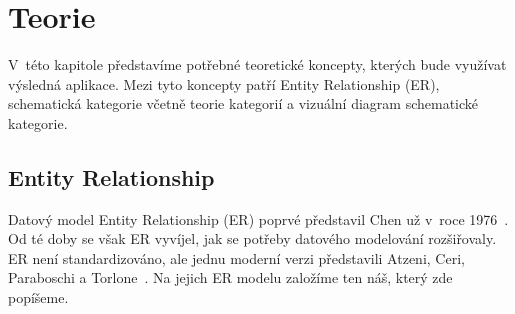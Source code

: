 \chapter{Teorie}

V~této kapitole představíme potřebné teoretické koncepty, kterých bude využívat výsledná aplikace.
Mezi tyto koncepty patří Entity Relationship (ER), schematická kategorie včetně teorie kategorií a vizuální diagram schematické kategorie.

\section{Entity Relationship}

Datový model Entity Relationship (ER) poprvé představil Chen už v~roce 1976~\cite{chen_entity-relationship_1976}.
Od té doby se však ER vyvíjel, jak se potřeby datového modelování rozšiřovaly.
ER není standardizováno, ale jednu moderní verzi představili Atzeni, Ceri, Paraboschi a Torlone~\cite[s.~163-179]{atzeni_database_1999}.
Na jejich ER modelu založíme ten náš, který zde popíšeme.


